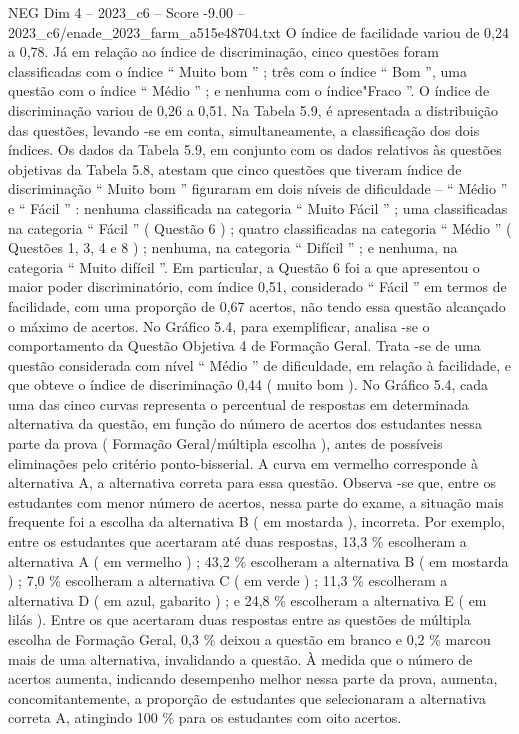 \begin{textsample}{NEG Dim 4 – 2023\_c6 – Score -9.00 – 2023\_c6/enade\_2023\_farm\_a515e48704.txt}
O índice de facilidade variou de 0,24 a 0,78.
Já em relação ao índice de discriminação, cinco questões foram classificadas com o índice “ Muito bom ” ; três com o índice “ Bom ”, uma questão com o índice “ Médio ” ; e nenhuma com o índice"Fraco ”.
O índice de discriminação variou de 0,26 a 0,51.
Na Tabela 5.9, é apresentada a distribuição das questões, levando -se em conta, simultaneamente, a classificação dos dois índices.
Os dados da Tabela 5.9, em conjunto com os dados relativos às questões objetivas da Tabela 5.8, atestam que cinco questões que tiveram índice de discriminação “ Muito bom ” figuraram em dois níveis de dificuldade – “ Médio ” e “ Fácil ” : nenhuma classificada na categoria “ Muito Fácil ” ; uma classificadas na categoria “ Fácil ” ( Questão 6 ) ; quatro classificadas na categoria “ Médio ” ( Questões 1, 3, 4 e 8 ) ; nenhuma, na categoria “ Difícil ” ; e nenhuma, na categoria “ Muito difícil ”.
Em particular, a Questão 6 foi a que apresentou o maior poder discriminatório, com índice 0,51, considerado “ Fácil ” em termos de facilidade, com uma proporção de 0,67 acertos, não tendo essa questão alcançado o máximo de acertos.
No Gráfico 5.4, para exemplificar, analisa -se o comportamento da Questão Objetiva 4 de Formação Geral.
Trata -se de uma questão considerada com nível “ Médio ” de dificuldade, em relação à facilidade, e que obteve o índice de discriminação 0,44 ( muito bom ).
No Gráfico 5.4, cada uma das cinco curvas representa o percentual de respostas em determinada alternativa da questão, em função do número de acertos dos estudantes nessa parte da prova ( Formação Geral/múltipla escolha ), antes de possíveis eliminações pelo critério ponto-bisserial.
A curva em vermelho corresponde à alternativa A, a alternativa correta para essa questão.
Observa -se que, entre os estudantes com menor número de acertos, nessa parte do exame, a situação mais frequente foi a escolha da alternativa B ( em mostarda ), incorreta.
Por exemplo, entre os estudantes que acertaram até duas respostas, 13,3 \% escolheram a alternativa A ( em vermelho ) ; 43,2 \% escolheram a alternativa B ( em mostarda ) ; 7,0 \% escolheram a alternativa C ( em verde ) ; 11,3 \% escolheram a alternativa D ( em azul, gabarito ) ; e 24,8 \% escolheram a alternativa E ( em lilás ).
Entre os que acertaram duas respostas entre as questões de múltipla escolha de Formação Geral, 0,3 \% deixou a questão em branco e 0,2 \% marcou mais de uma alternativa, invalidando a questão.
À medida que o número de acertos aumenta, indicando desempenho melhor nessa parte da prova, aumenta, concomitantemente, a proporção de estudantes que selecionaram a alternativa correta A, atingindo 100 \% para os estudantes com oito acertos.

\end{textsample}
